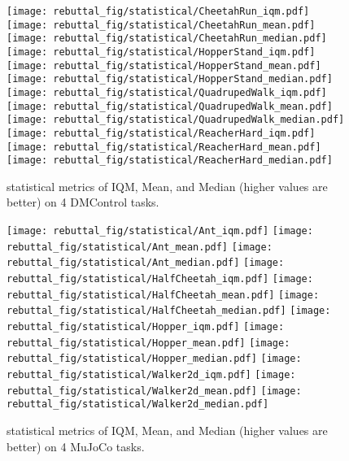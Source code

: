 \begin{figure}[t]
    \centering
    \texttt{[image: rebuttal\_fig/statistical/CheetahRun\_iqm.pdf]}
    \texttt{[image: rebuttal\_fig/statistical/CheetahRun\_mean.pdf]}
    \texttt{[image: rebuttal\_fig/statistical/CheetahRun\_median.pdf]}
    \texttt{[image: rebuttal\_fig/statistical/HopperStand\_iqm.pdf]}
    \texttt{[image: rebuttal\_fig/statistical/HopperStand\_mean.pdf]}
    \texttt{[image: rebuttal\_fig/statistical/HopperStand\_median.pdf]}
    \texttt{[image: rebuttal\_fig/statistical/QuadrupedWalk\_iqm.pdf]}
    \texttt{[image: rebuttal\_fig/statistical/QuadrupedWalk\_mean.pdf]}
    \texttt{[image: rebuttal\_fig/statistical/QuadrupedWalk\_median.pdf]}
    \texttt{[image: rebuttal\_fig/statistical/ReacherHard\_iqm.pdf]}
    \texttt{[image: rebuttal\_fig/statistical/ReacherHard\_mean.pdf]}
    \texttt{[image: rebuttal\_fig/statistical/ReacherHard\_median.pdf]}
    \caption{statistical metrics of IQM, Mean, and Median (higher values are better) on 4 DMControl tasks.}
    \label{fig:appendix_IQM_1}
\end{figure}

\begin{figure}[t]
    \centering
    \texttt{[image: rebuttal\_fig/statistical/Ant\_iqm.pdf]}
    \texttt{[image: rebuttal\_fig/statistical/Ant\_mean.pdf]}
    \texttt{[image: rebuttal\_fig/statistical/Ant\_median.pdf]}
    \texttt{[image: rebuttal\_fig/statistical/HalfCheetah\_iqm.pdf]}
    \texttt{[image: rebuttal\_fig/statistical/HalfCheetah\_mean.pdf]}
    \texttt{[image: rebuttal\_fig/statistical/HalfCheetah\_median.pdf]}
    \texttt{[image: rebuttal\_fig/statistical/Hopper\_iqm.pdf]}
    \texttt{[image: rebuttal\_fig/statistical/Hopper\_mean.pdf]}
    \texttt{[image: rebuttal\_fig/statistical/Hopper\_median.pdf]}
    \texttt{[image: rebuttal\_fig/statistical/Walker2d\_iqm.pdf]}
    \texttt{[image: rebuttal\_fig/statistical/Walker2d\_mean.pdf]}
    \texttt{[image: rebuttal\_fig/statistical/Walker2d\_median.pdf]}
    \caption{statistical metrics of IQM, Mean, and Median (higher values are better) on 4 MuJoCo tasks.}
    \label{fig:appendix_IQM_2}
\end{figure}

